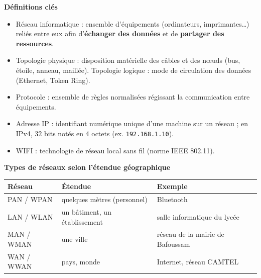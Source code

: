 \documentclass[11pt]{article}
\newcommand{\cle}[1]{{\popxbold\color{popdark}#1}}
\begin{document}
\begin{bilan}
\textbf{Définitions clés}
\begin{itemize}
  \item \cle{Réseau informatique} : ensemble d'équipements (ordinateurs, imprimantes\ldots) reliés entre eux afin d'\textbf{échanger des données} et de \textbf{partager des ressources}.
  \item \cle{Topologie physique} : disposition matérielle des câbles et des nœuds (bus, étoile, anneau, maillée). \cle{Topologie logique} : mode de circulation des données (Ethernet, Token Ring).
  \item \cle{Protocole} : ensemble de règles normalisées régissant la communication entre équipements.
  \item \cle{Adresse IP} : identifiant numérique unique d'une machine sur un réseau ; en IPv4, $32$ bits notés en 4 octets (ex. \texttt{192.168.1.10}).
  \item \cle{WIFI} : technologie de réseau local sans fil (norme IEEE 802.11).
\end{itemize}

\textbf{Types de réseaux selon l'étendue géographique}
\begin{center}
\begin{tabularx}{\linewidth}{|l|X|l|}
\hline
\rowcolor{popblueL} \textbf{Réseau} & \textbf{Étendue} & \textbf{Exemple} \\
\hline
PAN / WPAN & quelques mètres (personnel) & Bluetooth \\
\hline
LAN / WLAN & un bâtiment, un établissement & salle informatique du lycée \\
\hline
MAN / WMAN & une ville & réseau de la mairie de Bafoussam \\
\hline
WAN / WWAN & pays, monde & Internet, réseau CAMTEL \\
\hline
\end{tabularx}
\end{center}


\end{bilan}
\end{document}
